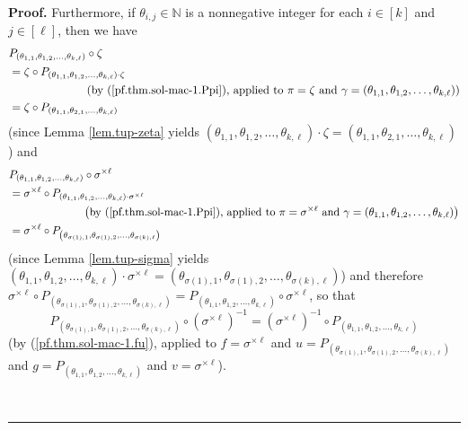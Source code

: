 \documentclass[numbers=enddot,12pt,final,onecolumn,notitlepage]{scrartcl}%
\theoremstyle{definition}
\newenvironment{proof}[1][Proof]{\noindent\textbf{#1.} }{\ \rule{0.5em}{0.5em}}
\begin{document}
\begin{proof}
Furthermore, if $\theta_{i,j}\in\mathbb{N}$ is a nonnegative integer for each
$i\in\left[  k\right]  $ and $j\in\left[  \ell\right]  $, then we have%
\begin{align}
&  P_{\left(  \theta_{1,1},\theta_{1,2},\ldots,\theta_{k,\ell}\right)  }%
\circ\zeta\nonumber\\
&  =\zeta\circ P_{\left(  \theta_{1,1},\theta_{1,2},\ldots,\theta_{k,\ell
}\right)  \cdot\zeta}\nonumber\\
&  \ \ \ \ \ \ \ \ \ \ \ \ \ \ \ \ \ \ \ \ \left(  \text{by
(\ref{pf.thm.sol-mac-1.Ppi}), applied to }\pi=\zeta\text{ and }\gamma=\left(
\theta_{1,1},\theta_{1,2},\ldots,\theta_{k,\ell}\right)  \right) \nonumber\\
&  =\zeta\circ P_{\left(  \theta_{1,1},\theta_{2,1},\ldots,\theta_{k,\ell
}\right)  } \label{pf.thm.sol-mac-1.Pz}%
\end{align}
(since Lemma \ref{lem.tup-zeta} yields $\left(  \theta_{1,1},\theta
_{1,2},\ldots,\theta_{k,\ell}\right)  \cdot\zeta=\left(  \theta_{1,1}%
,\theta_{2,1},\ldots,\theta_{k,\ell}\right)  $) and%
\begin{align*}
&  P_{\left(  \theta_{1,1},\theta_{1,2},\ldots,\theta_{k,\ell}\right)  }%
\circ\sigma^{\times\ell}\\
&  =\sigma^{\times\ell}\circ P_{\left(  \theta_{1,1},\theta_{1,2}%
,\ldots,\theta_{k,\ell}\right)  \cdot\sigma^{\times\ell}}\\
&  \ \ \ \ \ \ \ \ \ \ \ \ \ \ \ \ \ \ \ \ \left(  \text{by
(\ref{pf.thm.sol-mac-1.Ppi}), applied to }\pi=\sigma^{\times\ell}\text{ and
}\gamma=\left(  \theta_{1,1},\theta_{1,2},\ldots,\theta_{k,\ell}\right)
\right) \\
&  =\sigma^{\times\ell}\circ P_{\left(  \theta_{\sigma\left(  1\right)
,1},\theta_{\sigma\left(  1\right)  ,2},\ldots,\theta_{\sigma\left(  k\right)
,\ell}\right)  }%
\end{align*}
(since Lemma \ref{lem.tup-sigma} yields $\left(  \theta_{1,1},\theta
_{1,2},\ldots,\theta_{k,\ell}\right)  \cdot\sigma^{\times\ell}=\left(
\theta_{\sigma\left(  1\right)  ,1},\theta_{\sigma\left(  1\right)  ,2}%
,\ldots,\theta_{\sigma\left(  k\right)  ,\ell}\right)  $) and therefore
$\sigma^{\times\ell}\circ P_{\left(  \theta_{\sigma\left(  1\right)
,1},\theta_{\sigma\left(  1\right)  ,2},\ldots,\theta_{\sigma\left(  k\right)
,\ell}\right)  }=P_{\left(  \theta_{1,1},\theta_{1,2},\ldots,\theta_{k,\ell
}\right)  }\circ\sigma^{\times\ell}$, so that%
\begin{equation}
P_{\left(  \theta_{\sigma\left(  1\right)  ,1},\theta_{\sigma\left(  1\right)
,2},\ldots,\theta_{\sigma\left(  k\right)  ,\ell}\right)  }\circ\left(
\sigma^{\times\ell}\right)  ^{-1}=\left(  \sigma^{\times\ell}\right)
^{-1}\circ P_{\left(  \theta_{1,1},\theta_{1,2},\ldots,\theta_{k,\ell}\right)
} \label{pf.thm.sol-mac-1.Ps}%
\end{equation}
(by (\ref{pf.thm.sol-mac-1.fu}), applied to $f=\sigma^{\times\ell}$ and
$u=P_{\left(  \theta_{\sigma\left(  1\right)  ,1},\theta_{\sigma\left(
1\right)  ,2},\ldots,\theta_{\sigma\left(  k\right)  ,\ell}\right)  }$ and
$g=P_{\left(  \theta_{1,1},\theta_{1,2},\ldots,\theta_{k,\ell}\right)  }$ and
$v=\sigma^{\times\ell}$).


\end{proof}
\end{document}

